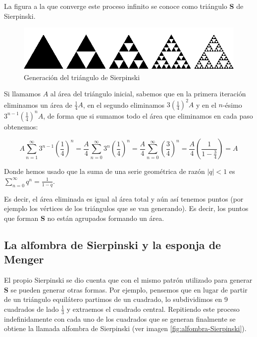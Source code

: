 La figura a la que converge este proceso infinito se conoce como triángulo \textbf{S} de Sierpinski.

\begin{figure} [h]
\centering
\includegraphics[scale = 0.6]{img/Sierpinski-triangle.png}
\caption{Generación del triángulo de Sierpinski}
 \label{fig:triangulo-Sierpinski}
\end{figure}

Si llamamos $A$ al área del triángulo inicial, sabemos que en la primera iteración eliminamos un área de $\frac 1 4 A$, en el segundo eliminamos $3 \left(\frac 1 4\right)^2 A$ y en el $n$-ésimo $3^{n-1}\left(\frac 1 4\right)^n A$, de forma que si sumamos todo el área que eliminamos en cada paso obtenemos:

$$
A \sum_{n=1}^\infty 3^{n-1}\left(\frac 1 4\right)^n  = \frac A 4  \sum_{n=0}^\infty 3^n\left(\frac 1 4\right)^n =  \frac A 4  \sum_{n=0}^\infty \left(\frac 3 4\right)^n = \frac{A}{4} \left(\frac{1}{1-\frac{3}{4}}\right) = A
$$

Donde hemos usado que la suma de una serie geométrica de razón $|q|<1$ es $\sum_{n=0}^\infty q^n = \frac{1}{1-q}$.

Es decir, el área eliminada es igual al área total y aún así tenemos puntos (por ejemplo los vértices de los triángulos que se van generando). Es decir, los puntos que forman \textbf{S} no están agrupados formando un área.

\subsection{La alfombra de Sierpinski y la esponja de Menger}
\label{subsection:alfombra-esponja}

El propio Sierpinski se dio cuenta que con el mismo patrón utilizado para generar \textbf{S} se pueden generar otras formas. Por ejemplo, pensemos que en lugar de partir de un triángulo equilátero partimos de un cuadrado, lo subdividimos en 9 cuadrados de lado $\frac 1 3$ y extraemos el cuadrado central. Repitiendo este proceso indefinidamente con cada uno de los cuadrados que se generan finalmente se obtiene la llamada alfombra de Sierpinski (ver imagen \ref{fig:alfombra-Sierpinski}).

